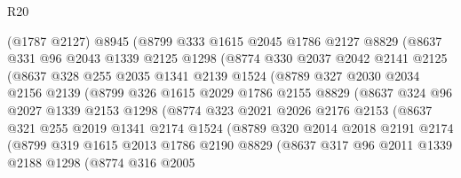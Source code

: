 \begin{lexlean}{R20}
\begin{coremodule}
            (@1787 @2127)
            @8945
            (@8799
              @333
              @1615
              @2045
              @1786
              @2127
              @8829
              (@8637
                @331
                @96
                @2043
                @1339
                @2125
                @1298
                (@8774
                  @330
                  @2037
                  @2042
                  @2141
                  @2125
                  (@8637
                    @328
                    @255
                    @2035
                    @1341
                    @2139
                    @1524
                    (@8789
                      @327
                      @2030
                      @2034
                      @2156
                      @2139
                      (@8799
                        @326
                        @1615
                        @2029
                        @1786
                        @2155
                        @8829
                        (@8637
                          @324
                          @96
                          @2027
                          @1339
                          @2153
                          @1298
                          (@8774
                            @323
                            @2021
                            @2026
                            @2176
                            @2153
                            (@8637
                              @321
                              @255
                              @2019
                              @1341
                              @2174
                              @1524
                              (@8789
                                @320
                                @2014
                                @2018
                                @2191
                                @2174
                                (@8799
                                  @319
                                  @1615
                                  @2013
                                  @1786
                                  @2190
                                  @8829
                                  (@8637
                                    @317
                                    @96
                                    @2011
                                    @1339
                                    @2188
                                    @1298
                                    (@8774
                                      @316
                                      @2005

\end{coremodule}
\end{lexlean}
